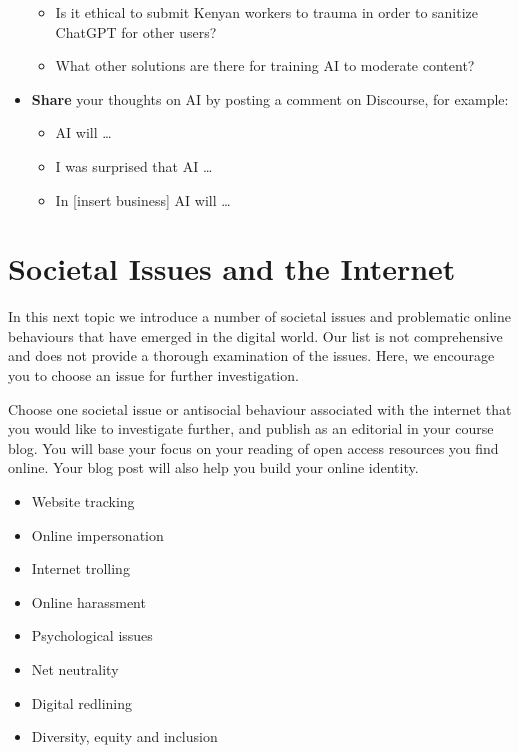 \documentclass[
  letterpaper,
  DIV=11,
  numbers=noendperiod]{scrreprt}
\providecommand{\tightlist}{%
  \setlength{\itemsep}{0pt}\setlength{\parskip}{0pt}}\usepackage{longtable,booktabs,array}
\begin{document}
\begin{tcolorbox}
\begin{itemize}
  \begin{itemize}
  \tightlist
  \item
    Is it ethical to submit Kenyan workers to trauma in order to
    sanitize ChatGPT for other users?
  \item
    What other solutions are there for training AI to moderate content?
  \end{itemize}
\item
  \textbf{Share} your thoughts on AI by posting a comment on Discourse,
  for example:

  \begin{itemize}
  \tightlist
  \item
    AI will \ldots{}
  \item
    I was surprised that AI \ldots{}
  \item
    In {[}insert business{]} AI will \ldots{}
  \end{itemize}
\end{itemize}

\end{tcolorbox}

\section{Societal Issues and the
Internet}\label{societal-issues-and-the-internet}

In this next topic we introduce a number of societal issues and
problematic online behaviours that have emerged in the digital world.
Our list is not comprehensive and does not provide a thorough
examination of the issues. Here, we encourage you to choose an issue for
further investigation.

Choose one societal issue or antisocial behaviour associated with the
internet that you would like to investigate further, and publish as an
editorial in your course blog. You will base your focus on your reading
of open access resources you find online. Your blog post will also help
you build your online identity.

\begin{itemize}
\tightlist
\item
  Website tracking
\item
  Online impersonation
\item
  Internet trolling
\item
  Online harassment
\item
  Psychological issues
\item
  Net neutrality
\item
  Digital redlining
\item
  Diversity, equity and inclusion
\end{itemize}
\end{document}
